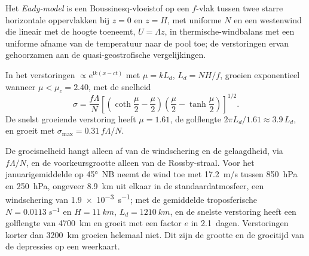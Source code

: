 \begin{definition}\label{def:b3:atmospheric-dynamics:eady}
Het \emph{Eady-model} is een Boussinesq-vloeistof op een
$f$-vlak tussen twee starre horizontale oppervlakken bij $z = 0$ en $z = H$, met
uniforme  $N$ en een westenwind die lineair met de hoogte
toeneemt, $U = \Lambda z$, in thermische-windbalans met een uniforme
afname van de temperatuur naar de pool toe; de verstoringen ervan gehoorzamen
aan de quasi-geostrofische vergelijkingen.
\end{definition}

\begin{theorem}\label{thm:b3:atmospheric-dynamics:eady}
In het  verstoringen $\propto \mathrm e^{\mathrm ik(x - ct)}$
met $\mu = kL_d$, $L_d = NH/f$, groeien exponentieel wanneer $\mu < \mu_c =
2.40$, met de snelheid
\[
\sigma = \frac{f\Lambda}{N}\left[\left(\coth\frac{\mu}{2} - \frac{\mu}{2}\right)\left(\frac{\mu}{2} - \tanh\frac{\mu}{2}\right)\right]^{1/2} .
\]
De snelst groeiende verstoring heeft $\mu = 1.61$, de golflengte $2\pi L_d/1.61
\approx 3.9\,L_d$, en groeit met $\sigma_{\max} = 0.31\,f\Lambda/N$.
\end{theorem}
\admitted

De groeisnelheid hangt alleen af van de windschering en de gelaagdheid, via
$f\Lambda/N$, en de voorkeursgrootte alleen van de Rossby-straal. Voor het
januarigemiddelde op \ang{45}~NB neemt de wind toe met \qty{17.2}{m/s} tussen
\qty{850}{hPa} en \qty{250}{hPa}, ongeveer \qty{8.9}{km} uit elkaar in de
standaardatmosfeer, een windschering van \qty{1.9e-3}{s^{-1}}; met de gemiddelde
troposferische $N = \qty{0.0113}{s^{-1}}$ en $H = \qty{11}{km}$, $L_d =
\qty{1210}{km}$, en de snelste verstoring heeft een golflengte van \qty{4700}{km}
en groeit met een factor $e$ in \num{2.1}~dagen. Verstoringen korter dan
\qty{3200}{km} groeien helemaal niet. Dit zijn de grootte en de groeitijd van de
depressies op een weerkaart.

